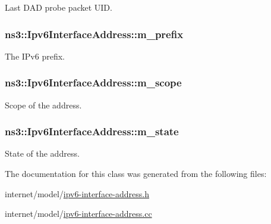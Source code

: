 Last D\+AD probe packet U\+ID. 

\subsubsection[{\texorpdfstring{m\+\_\+prefix}{m_prefix}}]{ ns3\+::\+Ipv6\+Interface\+Address\+::m\+\_\+prefix\hspace{0.3cm}{\ttfamily [private]}}\hypertarget{classns3_1_1Ipv6InterfaceAddress_ac0f3c2c541b81d15d029942c055dc0ed}{}\label{classns3_1_1Ipv6InterfaceAddress_ac0f3c2c541b81d15d029942c055dc0ed}


The I\+Pv6 prefix. 

\subsubsection[{\texorpdfstring{m\+\_\+scope}{m_scope}}]{ ns3\+::\+Ipv6\+Interface\+Address\+::m\+\_\+scope\hspace{0.3cm}{\ttfamily [private]}}\hypertarget{classns3_1_1Ipv6InterfaceAddress_ab54a5b874e1fd96b7ad176dc8bb90c89}{}\label{classns3_1_1Ipv6InterfaceAddress_ab54a5b874e1fd96b7ad176dc8bb90c89}


Scope of the address. 

\subsubsection[{\texorpdfstring{m\+\_\+state}{m_state}}]{ ns3\+::\+Ipv6\+Interface\+Address\+::m\+\_\+state\hspace{0.3cm}{\ttfamily [private]}}\hypertarget{classns3_1_1Ipv6InterfaceAddress_ab8143724ac3ae6eb71e3595e78b01b2f}{}\label{classns3_1_1Ipv6InterfaceAddress_ab8143724ac3ae6eb71e3595e78b01b2f}


State of the address. 



The documentation for this class was generated from the following files\+:\begin{DoxyCompactItemize}
\item 
internet/model/\hyperlink{ipv6-interface-address_8h}{ipv6-\/interface-\/address.\+h}\item 
internet/model/\hyperlink{ipv6-interface-address_8cc}{ipv6-\/interface-\/address.\+cc}\end{DoxyCompactItemize}
